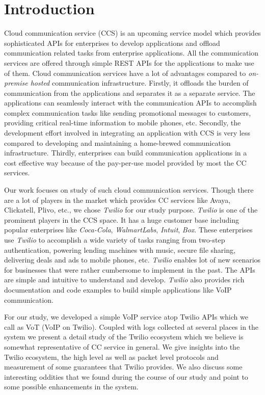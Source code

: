 \section{Introduction}
\label{sec-intro}
Cloud communication service (CCS) is an upcoming service model which provides sophisticated APIs for enterprises to develop applications and offload communication related tasks from enterprise applications. 
All the communication services are offered through simple REST APIs for the applications to make use of them. Cloud communication services have a lot of advantages compared to \textit{on-premise hosted} communication infrastructure. Firstly, it offloads the burden of communication from the applications and separates it as a separate service. The applications can seamlessly interact with the communication APIs to accomplish complex communication tasks like sending promotional messages to customers, providing critical real-time information to mobile phones, etc. Secondly, the development effort involved in integrating an application with CCS is very less compared to developing and maintaining a home-brewed communication infrastructure.
Thirdly, enterprises can build communication applications in a cost effective way because of the pay-per-use model provided by most the CC services. 


Our work focuses on study of such cloud communication services. Though there are a lot of players in the market which provides CC services like Avaya, Clickatell, Plivo, etc., we chose \textit{Twilio} for our study purpose. \textit{Twilio} is one of the prominent players in the CCS space. It has a huge customer base  including popular enterprises like \textit{Coca-Cola}, \textit{WalmartLabs}, \textit{Intuit}, \textit{Box}. These enterprises use \textit{Twilio} to accomplish a wide variety of tasks ranging from two-step authentication, powering lending machines with music, secure file sharing, delivering deals and ads to mobile phones, etc. \textit{Twilio} enables lot of new scenarios for businesses that were rather cumbersome to implement in the past. 
The APIs are simple and intuitive to understand and develop. \textit{Twilio} also provides rich documentation and code examples to build simple applications like VoIP communication.

 For our study, we developed a simple VoIP service atop Twilio APIs which we call as VoT (VoIP on Twilio). Coupled with logs collected at several places in the system we present a detail study of the Twilio ecosystem which we believe is somewhat representative of CC service in general. We give insights into the Twilio ecosystem, the high level as well as packet level protocols and measurement of some guarantees that Twilio provides.  We also discuss some interesting oddities that we found during the course of our study and point to some possible enhancements in the system. 